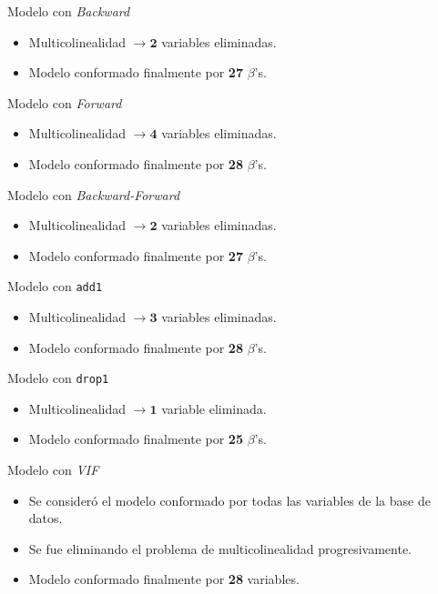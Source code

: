 \documentclass[11pt]{beamer}\usepackage{knitr}
\newcommand{\B}{\beta}
\newcommand{\cod}[1]{\texttt{\frenchspacing#1}}
\begin{document}
\begin{frame}{Modelo con \textit{Backward}}
	\begin{itemize}
		\item Multicolinealidad $\to \mathbf{2}$ variables eliminadas.
		\pause
		\item Modelo conformado finalmente por \textbf{27} $\B$'s.
	\end{itemize}
\end{frame}

\begin{frame}{Modelo con \textit{Forward}}
	\begin{itemize}
		\item Multicolinealidad $\to \mathbf{4}$ variables eliminadas.
		\pause
		\item Modelo conformado finalmente por \textbf{28} $\B$'s.
	\end{itemize}
\end{frame}

\begin{frame}{Modelo con \textit{Backward-Forward}}
	\begin{itemize}
		\item Multicolinealidad $\to \mathbf{2}$ variables eliminadas.
		\pause
		\item Modelo conformado finalmente por \textbf{27} $\B$'s.
	\end{itemize}
\end{frame}

\begin{frame}{Modelo con \cod{add1}}
	\begin{itemize}
		\item Multicolinealidad $\to \mathbf{3}$ variables eliminadas.
		\pause
		\item Modelo conformado finalmente por \textbf{28} $\B$'s.
	\end{itemize}
\end{frame}

\begin{frame}{Modelo con \cod{drop1}}
	\begin{itemize}
		\item Multicolinealidad $\to \mathbf{1}$ variable eliminada.
		\pause
		\item Modelo conformado finalmente por \textbf{25} $\B$'s.
	\end{itemize}
\end{frame}

\begin{frame}{Modelo con \textit{VIF}}
	\begin{itemize}
		\item Se consideró el modelo conformado por todas las variables de la base de datos.
		\pause
		\item Se fue eliminando el problema de multicolinealidad progresivamente.
		\pause
		\item Modelo conformado finalmente por \textbf{28} variables.
	\end{itemize}
\end{frame}
\end{document}
